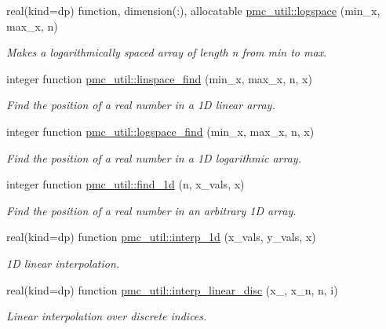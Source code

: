 \begin{DoxyCompactItemize}
real(kind=dp) function, dimension(\+:), allocatable \mbox{\hyperlink{namespacepmc__util_aaa2f79250374df571d379d895ceb7a71}{pmc\+\_\+util\+::logspace}} (min\+\_\+x, max\+\_\+x, n)
\begin{DoxyCompactList}\small\item\em Makes a logarithmically spaced array of length n from min to max. \end{DoxyCompactList}\item 
integer function \mbox{\hyperlink{namespacepmc__util_a1d5f058ff11d51e9083950422757e8b7}{pmc\+\_\+util\+::linspace\+\_\+find}} (min\+\_\+x, max\+\_\+x, n, x)
\begin{DoxyCompactList}\small\item\em Find the position of a real number in a 1D linear array. \end{DoxyCompactList}\item 
integer function \mbox{\hyperlink{namespacepmc__util_a8679b1591949031ddac4234e457fe048}{pmc\+\_\+util\+::logspace\+\_\+find}} (min\+\_\+x, max\+\_\+x, n, x)
\begin{DoxyCompactList}\small\item\em Find the position of a real number in a 1D logarithmic array. \end{DoxyCompactList}\item 
integer function \mbox{\hyperlink{namespacepmc__util_ac91afc829f34ff168c29ebd00f560cb2}{pmc\+\_\+util\+::find\+\_\+1d}} (n, x\+\_\+vals, x)
\begin{DoxyCompactList}\small\item\em Find the position of a real number in an arbitrary 1D array. \end{DoxyCompactList}\item 
real(kind=dp) function \mbox{\hyperlink{namespacepmc__util_aa7405c9d93fafa02adb9b51f7a8acadf}{pmc\+\_\+util\+::interp\+\_\+1d}} (x\+\_\+vals, y\+\_\+vals, x)
\begin{DoxyCompactList}\small\item\em 1D linear interpolation. \end{DoxyCompactList}\item 
real(kind=dp) function \mbox{\hyperlink{namespacepmc__util_a6b98d6e94a23e0223f1e78ee4cbdca64}{pmc\+\_\+util\+::interp\+\_\+linear\+\_\+disc}} (x\+\_, x\+\_\+n, n, i)
\begin{DoxyCompactList}\small\item\em Linear interpolation over discrete indices. \end{DoxyCompactList}\item 

\end{DoxyCompactItemize}
